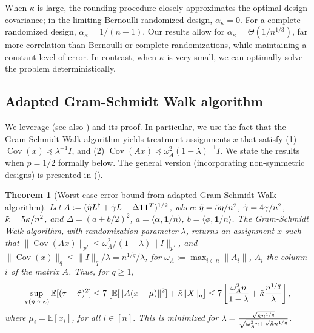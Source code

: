 \documentclass[12pt]{article}
\newtheorem{theorem}{Theorem}
\theoremstyle{definition}
\numberwithin{equation}{section}
\numberwithin{figure}{section}
\numberwithin{equation}{section}
\numberwithin{figure}{section}
\begin{document}
When $\kappa$ is large, the rounding procedure closely approximates the optimal design covariance; in the limiting Bernoulli randomized design, $\alpha_\kappa = 0$.
For a complete randomized design, $\alpha_\kappa = 1/(n-1)$. Our results allow for $\alpha_\kappa = \Theta(1/ n^{1/3})$, far more correlation than Bernoulli or complete randomizations, while maintaining a constant level of error. In contrast, when $\kappa$ is very small, we can optimally solve the problem deterministically.

\subsection{Adapted Gram-Schmidt Walk algorithm}

We leverage \citet[Theorem 6.4]{harshaw2024balancing} (see also ) and its proof. In particular, we use the fact that the Gram-Schmidt Walk algorithm yields treatment assignments $x$ that satisfy (1) $\operatorname{Cov}(x) \preceq \lambda^{-1}I$, and (2) $\operatorname{Cov}(Ax) \preceq \omega_A^2 (1-\lambda)^{-1}I$. 
We state the results when $p= 1/2$ formally below. The general version (incorporating non-symmetric designs) is presented in  ().

\begin{theorem} [Worst-case error bound from adapted Gram-Schmidt Walk algorithm] \label{thm:gsw}
Let $A:=(\Tilde{\eta}L^{\dagger} +\Tilde{\gamma} L + \Delta \mathbf{1} \mathbf{1}^T)^{1/2}$, where $\Tilde{\eta} = 5\eta/n^2$, $\Tilde{\gamma} = 4\gamma/n^2$, $\Tilde{\kappa} = 5\kappa/n^2$, and $\Delta = (a + b /2)^2$, $a = \langle \alpha, \mathbf{1}/n\rangle$, $b = \langle \phi, \mathbf{1}/n\rangle$.
The Gram-Schmidt Walk algorithm, with randomization parameter $\lambda$, returns an assignment $x$ such that $\|\operatorname{Cov}(Ax)\|_{{p'}} \leq \omega_A^2/(1-\lambda)\|I \|_{{p'}}$, and $\|\operatorname{Cov}(x)\|_{q}\leq \|I\|_{q}/\lambda=n^{1/q}/\lambda$, for $\omega_A := \max_{i\in n} \|A_i\|$, $A_i$ the column $i$ of the matrix $A$. Thus, for $q \geq 1$,
\[
\sup_{\chi(\eta, \gamma, \kappa)} \mathbb{E}[(\tau - \hat{\tau})^2] \leq 7 \left[\mathbb{E}[\|A(x-\mu)\|^2] + \Tilde{\kappa}\|X\|_{q} \right] \leq 7 \left[\frac{\omega_A^2 n}{1-\lambda} + \Tilde{\kappa}\frac{n^{1/q}}{\lambda}\right],
\] where $\mu_i = \mathbb{E}[x_i]$, for all $i \in [n].$
This is minimized for $\lambda = \frac{\sqrt{\Tilde{\kappa} n^{1/q}}}{ \sqrt{\omega_A^2n} + \sqrt{\Tilde{\kappa}n^{1/q}}}$. 
\end{theorem}
\end{document}
